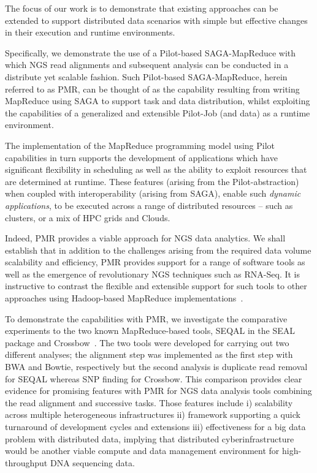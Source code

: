 \documentclass{acm_proc_article-sp}
\begin{document}
The focus of our work is to demonstrate that existing approaches can
be extended to support distributed data scenarios with simple but
effective changes in their execution and runtime environments.

Specifically, we demonstrate the use of a Pilot-based SAGA-MapReduce
with which NGS read alignments and subsequent analysis can be
conducted in a distribute yet scalable fashion. Such Pilot-based
SAGA-MapReduce, herein referred to as PMR, can be thought of as the
capability resulting from writing MapReduce using SAGA to support task
and data distribution, whilst exploiting the capabilities of a
generalized and extensible Pilot-Job (and data) as a runtime
environment\cite{Sehgal2011590,pmr2012,pstar11}.

The implementation of the MapReduce programming model using Pilot
capabilities in turn supports the development of applications which
have significant flexibility in scheduling as well as the ability to
exploit resources that are determined at runtime.  These features
(arising from the Pilot-abstraction) when coupled with
interoperability (arising from SAGA), enable such {\it dynamic
  applications}, to be executed across a range of distributed
resources -- such as clusters, or a mix of HPC grids and Clouds.

Indeed, PMR provides a viable approach for NGS data analytics.  We
shall establish that in addition to the challenges arising from the
required data volume scalability and efficiency, PMR provides support
for a range of software tools as well as the emergence of
revolutionary NGS techniques such as RNA-Seq.  It is instructive to
contrast the flexible and extensible support for such tools to other
approaches using Hadoop-based MapReduce
implementations~\cite{cloudburst,langmead2009,seal2011,langmead2010}.

To demonstrate the capabilities with PMR, we investigate the
comparative experiments to the two known MapReduce-based tools, SEQAL
in the SEAL package and Crossbow~\cite{seal2011,langmead2010}.  The
two tools were developed for carrying out two different analyses; the
alignment step was implemented as the first step with BWA and Bowtie,
respectively but the second analysis is duplicate read removal for
SEQAL whereas SNP finding for Crossbow.  This comparison provides
clear evidence for promising features with PMR for NGS data analysis
tools combining the read alignment and successive tasks.  Those
features include i) scalability across multiple heterogeneous
infrastructures ii) framework supporting a quick turnaround of
development cycles and extensions iii) effectiveness for a big data
problem with distributed data, implying that distributed
cyberinfrastructure would be another viable compute and data
management environment for high-throughput DNA sequencing data.
\end{document}
